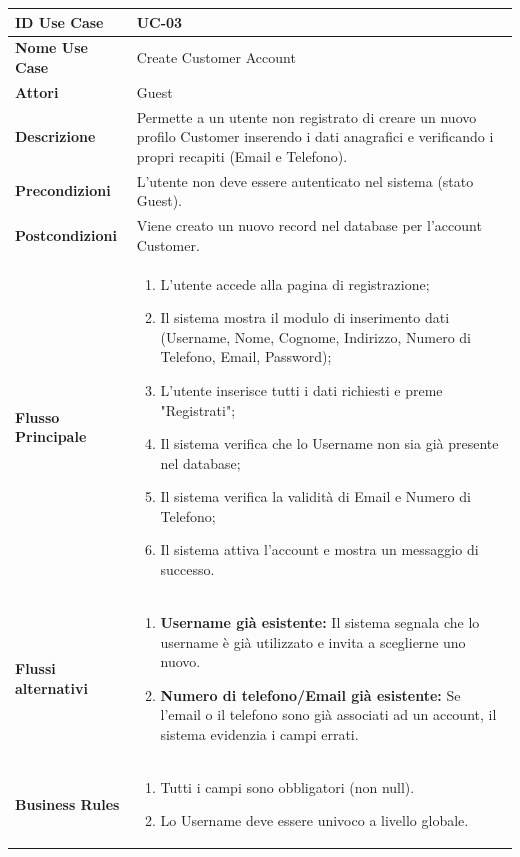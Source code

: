 \documentclass{article}
\newcommand{\usecasetable}[9]{
	\begin{table}[h!]
		\centering
		\footnotesize
		\renewcommand{\arraystretch}{1.4}
		\begin{tabularx}{\textwidth}{|l|>{\raggedright\arraybackslash}X|}
			\hline
			\textbf{ID Use Case} & #1 \\ \hline
			\textbf{Nome Use Case} & #2 \\ \hline
			\textbf{Attori} & #3 \\ \hline
			\textbf{Descrizione} & #4 \\ \hline
			\textbf{Precondizioni} & #5 \\ \hline
			\textbf{Postcondizioni} & #6 \\ \hline
			\textbf{Flusso Principale} & #7 \\ \hline
			\textbf{Flussi alternativi} & #8 \\ \hline
			\textbf{Business Rules} & #9 \\ \hline
		\end{tabularx}
	\end{table}
}
\begin{document}
	\usecasetable
	{UC-03}
	{Create Customer Account}
	{Guest}
	{Permette a un utente non registrato di creare un nuovo profilo Customer inserendo i dati anagrafici e verificando i propri recapiti (Email e Telefono).}
	{L'utente non deve essere autenticato nel sistema (stato Guest).}
	{Viene creato un nuovo record nel database per l'account Customer.}
	{
		\begin{enumerate}[nosep, leftmargin=*]
			\item L'utente accede alla pagina di registrazione;
			\item Il sistema mostra il modulo di inserimento dati (Username, Nome, Cognome, Indirizzo, Numero di Telefono, Email, Password);
			\item L'utente inserisce tutti i dati richiesti e preme "Registrati";
			\item Il sistema verifica che lo Username non sia già presente nel database;
			\item Il sistema verifica la validità di Email e Numero di Telefono;
			\item Il sistema attiva l'account e mostra un messaggio di successo.
		\end{enumerate}
	}
	{
		\begin{enumerate}[nosep, leftmargin=25px]
			\item[\textbf{4a.}] \textbf{Username già esistente:} Il sistema segnala che lo username è già utilizzato e invita a sceglierne uno nuovo.
			\item[\textbf{5a.}] \textbf{Numero di telefono/Email già esistente:} Se l'email o il telefono sono già associati ad un account, il sistema evidenzia i campi errati.
		\end{enumerate}
	}
	{
		\begin{enumerate}[nosep, leftmargin=*]
			\item[•] Tutti i campi sono obbligatori (non null).
			\item[•] Lo Username deve essere univoco a livello globale.
		\end{enumerate}
	}
		
	\newpage
	
\end{document}
